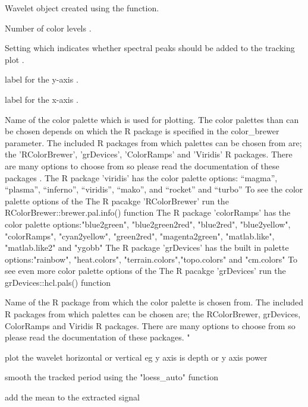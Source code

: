 \documentclass[a4paper]{book}
\begin{document}
\begin{Arguments}
\begin{ldescription}
\item[\code{wavelet}] Wavelet object created using the  function.

\item[\code{n.levels}] Number of color levels .

\item[\code{add\_peaks}] Setting which indicates whether spectral peaks should be
added to the tracking plot  .

\item[\code{periodlab}] label for the y-axis .

\item[\code{x\_lab}] label for the x-axis .

\item[\code{palette\_name}] Name of the color palette which is used for plotting.
The color palettes than can be chosen depends on which the R package is specified in
the color\_brewer parameter. The included R packages from which palettes can be chosen
from are; the 'RColorBrewer', 'grDevices', 'ColorRamps' and 'Viridis' R packages.
There are many options to choose from so please
read the documentation of these packages .
The R package 'viridis' has the color palette options: “magma”, “plasma”,
“inferno”, “viridis”, “mako”, and “rocket”  and “turbo”
To see the color palette options of the The R pacakge 'RColorBrewer' run
the RColorBrewer::brewer.pal.info() function
The R package 'colorRamps' has the color palette options:"blue2green",
"blue2green2red", "blue2red",    "blue2yellow", "colorRamps",    "cyan2yellow",
"green2red", "magenta2green", "matlab.like", "matlab.like2" and    "ygobb"
The R package 'grDevices' has the built in  palette options:"rainbow",
"heat.colors", "terrain.colors","topo.colors" and "cm.colors"
To see even more color palette options of the The R pacakge 'grDevices' run
the grDevices::hcl.pals() function

\item[\code{color\_brewer}] Name of the R package from which the color palette is chosen from.
The included R packages from which palettes can be chosen
are; the RColorBrewer, grDevices, ColorRamps and Viridis R packages.
There are many options to choose from so please
read the documentation of these packages. "

\item[\code{plot\_horizontal}] plot the wavelet horizontal or vertical eg y axis is depth or y axis power  

\item[\code{smooth}] smooth the tracked period using the "loess\_auto" function

\item[\code{add\_mean}] add the mean to the extracted signal
\end{ldescription}
\end{Arguments}
\end{document}
